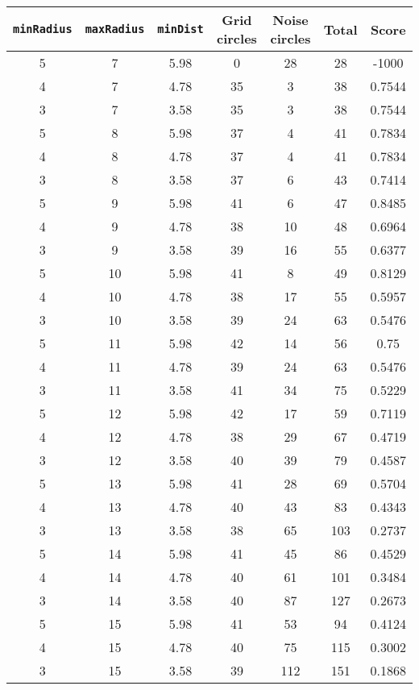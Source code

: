 \documentclass[letterpaper, 12pt]{article}
\begin{document}
\begin{longtable}{|c|c|c|c|c|c|c|}
\hline
\textbf{\texttt{minRadius}} & \textbf{\texttt{maxRadius}} & \textbf{\texttt{minDist}} & \textbf{Grid circles} & \textbf{Noise circles} & \textbf{Total} & \textbf{Score} \\
\hline
5 & 7 & 5.98 & 0 & 28 & 28 & -1000 \\
\hline
4 & 7 & 4.78 & 35 & 3 & 38 & 0.7544 \\
\hline
3 & 7 & 3.58 & 35 & 3 & 38 & 0.7544 \\
\hline
5 & 8 & 5.98 & 37 & 4 & 41 & 0.7834 \\
\hline
4 & 8 & 4.78 & 37 & 4 & 41 & 0.7834 \\
\hline
3 & 8 & 3.58 & 37 & 6 & 43 & 0.7414 \\
\hline
5 & 9 & 5.98 & 41 & 6 & 47 & 0.8485 \\
\hline
4 & 9 & 4.78 & 38 & 10 & 48 & 0.6964 \\
\hline
3 & 9 & 3.58 & 39 & 16 & 55 & 0.6377 \\
\hline
5 & 10 & 5.98 & 41 & 8 & 49 & 0.8129 \\
\hline
4 & 10 & 4.78 & 38 & 17 & 55 & 0.5957 \\
\hline
3 & 10 & 3.58 & 39 & 24 & 63 & 0.5476 \\
\hline
5 & 11 & 5.98 & 42 & 14 & 56 & 0.75 \\
\hline
4 & 11 & 4.78 & 39 & 24 & 63 & 0.5476 \\
\hline
3 & 11 & 3.58 & 41 & 34 & 75 & 0.5229 \\
\hline
5 & 12 & 5.98 & 42 & 17 & 59 & 0.7119 \\
\hline
4 & 12 & 4.78 & 38 & 29 & 67 & 0.4719 \\
\hline
3 & 12 & 3.58 & 40 & 39 & 79 & 0.4587 \\
\hline
5 & 13 & 5.98 & 41 & 28 & 69 & 0.5704 \\
\hline
4 & 13 & 4.78 & 40 & 43 & 83 & 0.4343 \\
\hline
3 & 13 & 3.58 & 38 & 65 & 103 & 0.2737 \\
\hline
5 & 14 & 5.98 & 41 & 45 & 86 & 0.4529 \\
\hline
4 & 14 & 4.78 & 40 & 61 & 101 & 0.3484 \\
\hline
3 & 14 & 3.58 & 40 & 87 & 127 & 0.2673 \\
\hline
5 & 15 & 5.98 & 41 & 53 & 94 & 0.4124 \\
\hline
4 & 15 & 4.78 & 40 & 75 & 115 & 0.3002 \\
\hline
3 & 15 & 3.58 & 39 & 112 & 151 & 0.1868 \\

\end{longtable}
\end{document}

